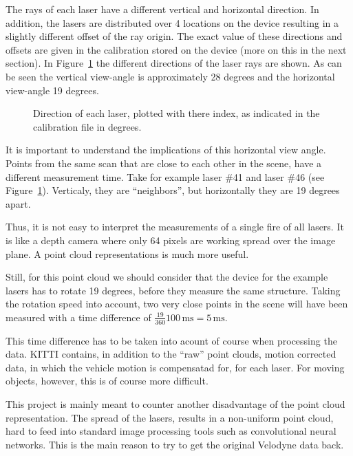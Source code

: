 \documentclass[english]{article}
\begin{document}
The rays of each laser have a different vertical and horizontal
direction. In addition, the lasers are distributed over 4 locations on
the device resulting in a slightly different offset of the ray origin.
The exact value of these directions and offsets are given in the
calibration stored on the device (more on this in the next section).
In Figure~\ref{fig:directions} the different directions of the laser
rays are shown. As can be seen the vertical view-angle is approximately
28 degrees and the horizontal view-angle 19 degrees.

\begin{figure}
    \centering
    \def\svgwidth{\columnwidth}
    \scalebox{0.9}{
    \def\svgwidth{.6 \columnwidth}
      
    }
    \caption{Direction of each laser, plotted with there index, as
    indicated in the calibration file in degrees.}
		\label{fig:directions}
\end{figure}

It is important to understand the implications of this horizontal view
angle. Points from the same scan that are close to each other in the
scene, have a different measurement time. Take for example laser \#41
and laser \#46 (see Figure~\ref{fig:directions}). Verticaly, they are
``neighbors'', but horizontally they are 19 degrees apart.

Thus, it is not easy to interpret the measurements of a single fire of all
lasers. It is like a depth camera where only 64 pixels are working spread over
the image plane. A point cloud representations is much more useful.

Still, for this point cloud we should consider that the device for the
example lasers has to rotate 19 degrees, before they measure the same
structure. Taking the rotation speed into account, two very close points
in the scene will have been measured with a time difference of
$\frac{19}{360} 100 \, \mbox{ms}= 5 \, \mbox{ms}$.

This time difference has to be taken into acount of course when
processing the data. KITTI contains, in addition to the ``raw'' point
clouds, motion corrected data, in which the vehicle motion is
compensatad for, for each laser. For moving objects, however, this is of
course more difficult.

This project is mainly meant to counter another
disadvantage of the point cloud representation. The spread of the
lasers, results in a non-uniform point cloud, hard to feed into standard image
processing tools such as convolutional neural networks. This is the main reason
to try to get the original Velodyne data back.
\end{document}
